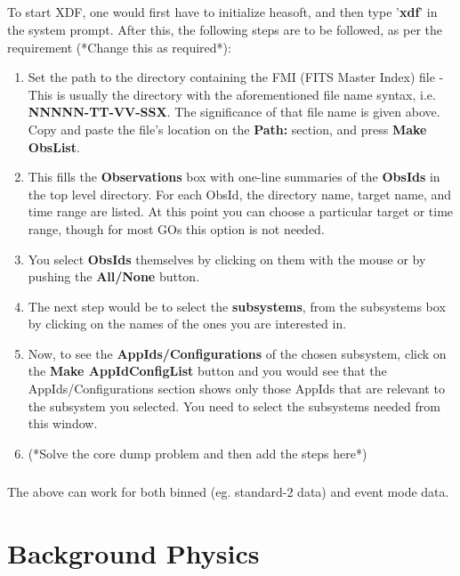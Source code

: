 \documentclass[a4paper,twoside]{report}
\numberwithin{equation}{section}
\begin{document}
\paragraph{}
To start XDF, one would first have to initialize heasoft, and then type '\textbf{xdf}' in the system prompt. After this, the following steps are to be followed, as per the requirement (*Change this as required*):
\begin{enumerate}
\item Set the path to the directory containing the FMI (FITS Master Index) file - This is usually the directory with the aforementioned file name syntax, i.e. \textbf{NNNNN-TT-VV-SSX}. The significance of that file name is given above. Copy and paste the file's location on the \textbf{Path:} section, and press \textbf{Make ObsList}.
\item This fills the \textbf{Observations} box with one-line summaries of the \textbf{ObsIds} in the top level directory. For each ObsId, the directory name, target name, and time range are listed. At this point you can choose a particular target or time range, though for most GOs this option is not needed.
\item You select \textbf{ObsIds} themselves by clicking on them with the mouse or by pushing the \textbf{All/None} button.
\item The next step would be to select the \textbf{subsystems}, from the subsystems box by clicking on the names of the ones you are interested in. 
\item Now, to see the \textbf{AppIds/Configurations} of the chosen subsystem, click on the \textbf{Make AppIdConfigList} button and you would see that the AppIds/Configurations section shows only those AppIds that are relevant to the subsystem you selected. You need to select the subsystems needed from this window.
\item (*Solve the core dump problem and then add the steps here*)
\end{enumerate}
\paragraph{}
The above can work for both binned (eg. standard-2 data) and event mode data.












\newpage
\chapter{Background Physics}
\end{document}

